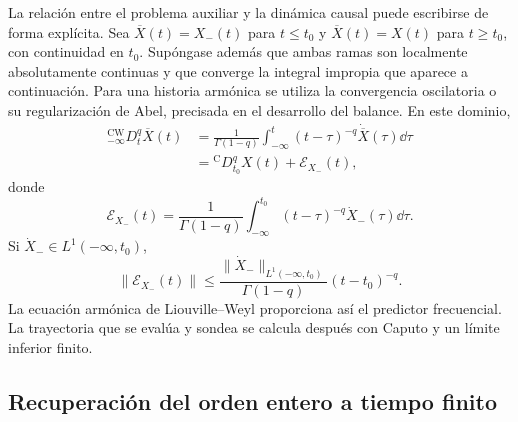 La relación entre el problema auxiliar y la dinámica causal puede escribirse
de forma explícita. Sea \(\overline X(t)=X_-(t)\) para \(t\leq t_0\) y
\(\overline X(t)=X(t)\) para \(t\geq t_0\), con continuidad en \(t_0\).
Supóngase además que ambas ramas son localmente absolutamente continuas
y que converge la integral impropia que aparece a continuación.
Para una historia armónica se utiliza la convergencia oscilatoria o su
regularización de Abel, precisada en el desarrollo del balance.
En este dominio,
\begin{equation}
\begin{aligned}
{}_{-\infty}^{\mathrm{CW}}D_t^q\overline X(t)
&=
\frac{1}{\Gamma(1-q)}
\int_{-\infty}^{t}(t-\tau)^{-q}\dot{\overline X}(\tau)\dd\tau\\
&={}^{\mathrm C}D_{t_0}^{q}X(t)+\mathcal E_{X_-}(t),
\end{aligned}
\label{eq:puente_weyl_caputo}
\end{equation}
donde
\begin{equation}
\mathcal E_{X_-}(t)=
\frac{1}{\Gamma(1-q)}
\int_{-\infty}^{t_0}(t-\tau)^{-q}\dot X_-(\tau)\dd\tau.
\label{eq:memoria_previa}
\end{equation}
Si \(\dot X_-\in L^1(-\infty,t_0)\),
\begin{equation}
\|\mathcal E_{X_-}(t)\|
\leq
\frac{\|\dot X_-\|_{L^1(-\infty,t_0)}}{\Gamma(1-q)}
(t-t_0)^{-q}.
\label{eq:cota_memoria_previa}
\end{equation}
La ecuación armónica de Liouville--Weyl proporciona así el predictor
frecuencial. La trayectoria que se evalúa y sondea se calcula después con
Caputo y un límite inferior finito.

\subsection{Recuperación del orden entero a tiempo finito}
\label{sec:limite-entero-tiempo-finito}

